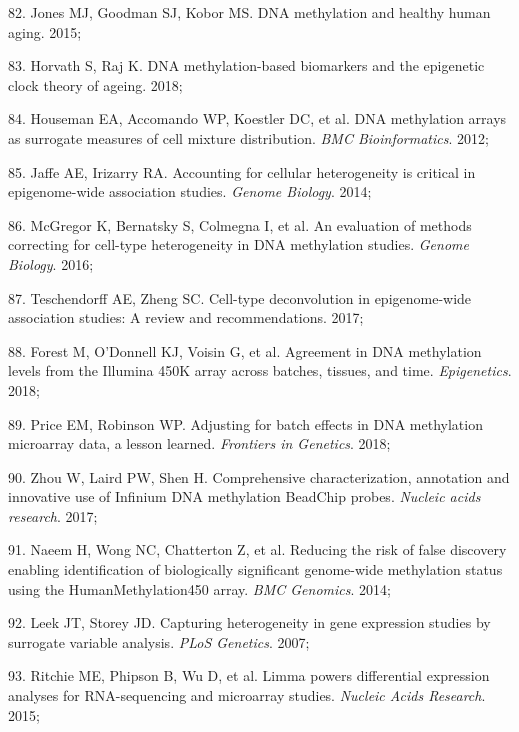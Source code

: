 \documentclass[11pt,oneside]{bristolthesis}
\newenvironment{cslreferences}%
  {}%
  {\par}
\begin{document}
\begin{cslreferences}
\leavevmode\hypertarget{ref-Jones2015}{}%
82. Jones MJ, Goodman SJ, Kobor MS. DNA methylation and healthy human aging. 2015;

\leavevmode\hypertarget{ref-Horvath2018}{}%
83. Horvath S, Raj K. DNA methylation-based biomarkers and the epigenetic clock theory of ageing. 2018;

\leavevmode\hypertarget{ref-Houseman2012}{}%
84. Houseman EA, Accomando WP, Koestler DC, et al. DNA methylation arrays as surrogate measures of cell mixture distribution. \emph{BMC Bioinformatics}. 2012;

\leavevmode\hypertarget{ref-Jaffe2014}{}%
85. Jaffe AE, Irizarry RA. Accounting for cellular heterogeneity is critical in epigenome-wide association studies. \emph{Genome Biology}. 2014;

\leavevmode\hypertarget{ref-McGregor2016}{}%
86. McGregor K, Bernatsky S, Colmegna I, et al. An evaluation of methods correcting for cell-type heterogeneity in DNA methylation studies. \emph{Genome Biology}. 2016;

\leavevmode\hypertarget{ref-Teschendorff2017}{}%
87. Teschendorff AE, Zheng SC. Cell-type deconvolution in epigenome-wide association studies: A review and recommendations. 2017;

\leavevmode\hypertarget{ref-Forest2018}{}%
88. Forest M, O'Donnell KJ, Voisin G, et al. Agreement in DNA methylation levels from the Illumina 450K array across batches, tissues, and time. \emph{Epigenetics}. 2018;

\leavevmode\hypertarget{ref-Price2018}{}%
89. Price EM, Robinson WP. Adjusting for batch effects in DNA methylation microarray data, a lesson learned. \emph{Frontiers in Genetics}. 2018;

\leavevmode\hypertarget{ref-Zhou2017}{}%
90. Zhou W, Laird PW, Shen H. Comprehensive characterization, annotation and innovative use of Infinium DNA methylation BeadChip probes. \emph{Nucleic acids research}. 2017;

\leavevmode\hypertarget{ref-Naeem2014}{}%
91. Naeem H, Wong NC, Chatterton Z, et al. Reducing the risk of false discovery enabling identification of biologically significant genome-wide methylation status using the HumanMethylation450 array. \emph{BMC Genomics}. 2014;

\leavevmode\hypertarget{ref-Leek2007}{}%
92. Leek JT, Storey JD. Capturing heterogeneity in gene expression studies by surrogate variable analysis. \emph{PLoS Genetics}. 2007;

\leavevmode\hypertarget{ref-Ritchie2015}{}%
93. Ritchie ME, Phipson B, Wu D, et al. Limma powers differential expression analyses for RNA-sequencing and microarray studies. \emph{Nucleic Acids Research}. 2015;


\end{cslreferences}
\end{document}
